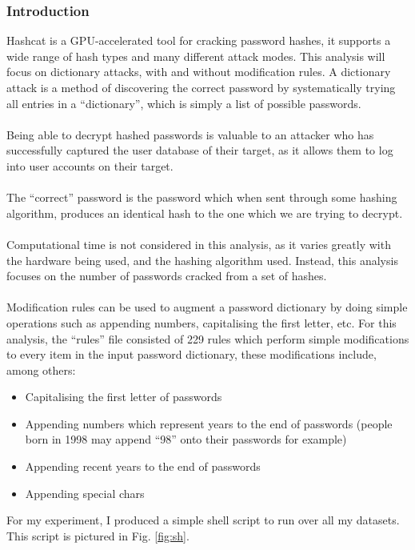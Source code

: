 \documentclass[11pt]{article}
\begin{document}
\subsubsection{Introduction}
Hashcat is a GPU-accelerated tool for cracking password hashes, it supports a wide range of hash types and many different attack modes.
This analysis will focus on dictionary attacks, with and without modification rules.
A dictionary attack is a method of discovering the correct password by systematically trying all entries in a ``dictionary'', which is simply a list of possible passwords.\\\\
Being able to decrypt hashed passwords is valuable to an attacker who has successfully captured the user database of their target, as it allows them to log into user accounts on their target.\\\\
The ``correct'' password is the password which when sent through some hashing algorithm, produces an identical hash to the one which we are trying to decrypt.\\\\
Computational time is not considered in this analysis, as it varies greatly with the hardware being used, and the hashing algorithm used.
Instead, this analysis focuses on the number of passwords cracked from a set of hashes.\\\\
Modification rules can be used to augment a password dictionary by doing simple operations such as appending numbers, capitalising the first letter, etc.
For this analysis, the ``rules'' file consisted of 229 rules which perform simple modifications to every item in the input password dictionary, these modifications include, among others:
\begin{itemize}
\item Capitalising the first letter of passwords
\item Appending numbers which represent years to the end of passwords (people born in 1998 may append ``98'' onto their passwords for example)
\item Appending recent years to the end of passwords
\item Appending special chars
\end{itemize}
For my experiment, I produced a simple shell script to run over all my datasets. This script is pictured in Fig. \ref{fig:sh}.
\end{document}
